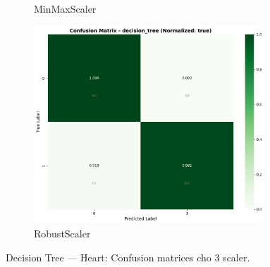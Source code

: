 \begin{figure}[H]
\begin{subfigure}[b]{0.31\textwidth}
\caption{MinMaxScaler}\label{fig:dt_heart_cm_minmax}
\end{subfigure}\hfill
\begin{subfigure}[b]{0.31\textwidth}\centering
\includegraphics[width=0.95\textwidth]{Result/heart_dataset/confusion_matrices/decision_tree_numeric_dataset_RobustScaler.png}
\caption{RobustScaler}\label{fig:dt_heart_cm_robust}
\end{subfigure}
\caption{Decision Tree — Heart: Confusion matrices cho 3 scaler.}
\label{fig:dt_heart_confusions}
\end{figure}

